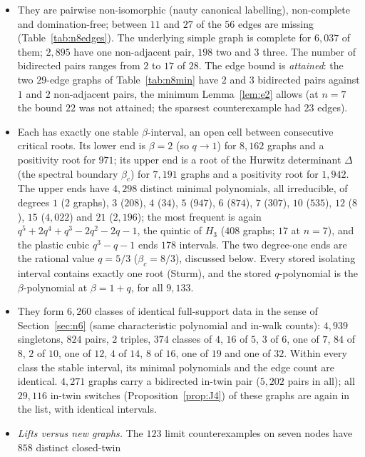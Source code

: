 \documentclass[11pt]{article}
\theoremstyle{definition}
\begin{document}
\begin{itemize}
\item They are pairwise non-isomorphic (nauty canonical labelling), non-complete and domination-free; between $11$ and
$27$ of the $56$ edges are missing (Table~\ref{tab:n8edges}). The underlying simple graph is complete for $6{,}037$ of them;
$2{,}895$ have one non-adjacent pair, $198$ two and $3$ three. The number of bidirected pairs ranges from $2$ to $17$ of
$28$. The edge bound is \emph{attained}: the two $29$-edge graphs of Table~\ref{tab:n8min} have $2$ and $3$ bidirected pairs
against $1$ and $2$ non-adjacent pairs, the minimum Lemma~\ref{lem:e2} allows (at $n=7$ the bound $22$ was not attained; the
sparsest counterexample had $23$ edges).
\item Each has exactly one stable $\beta$-interval, an open cell between consecutive critical roots. Its lower end is $\beta=2$
(so $q\to1$) for $8{,}162$ graphs and a positivity root for $971$; its upper end is a root of the Hurwitz determinant
$\Delta$ (the spectral boundary $\beta_c$) for $7{,}191$ graphs and a positivity root for $1{,}942$. The upper ends have
$4{,}298$ distinct minimal polynomials, all irreducible, of degrees $1$ ($2$ graphs), $3$ ($208$), $4$ ($34$), $5$ ($947$),
$6$ ($874$), $7$ ($307$), $10$ ($535$), $12$ ($8$), $15$ ($4{,}022$) and $21$ ($2{,}196$); the most frequent is again
$q^5+2q^4+q^3-2q^2-2q-1$, the quintic of $H_3$ ($408$ graphs; $17$ at $n=7$), and the plastic cubic $q^3-q-1$ ends
$178$ intervals. The two degree-one ends are the rational value $q=5/3$ ($\beta_c=8/3$), discussed below. Every stored
isolating interval contains exactly one root (Sturm), and the stored $q$-polynomial is the $\beta$-polynomial at
$\beta=1+q$, for all $9{,}133$.
\item They form $6{,}260$ classes of identical full-support data in the sense of Section~\ref{sec:n6} (same characteristic
polynomial and in-walk counts): $4{,}939$ singletons, $824$ pairs, $2$ triples, $374$ classes of $4$, $16$ of $5$, $3$ of
$6$, one of $7$, $84$ of $8$, $2$ of $10$, one of $12$, $4$ of $14$, $8$ of $16$, one of $19$ and one of $32$. Within every
class the stable interval, its minimal polynomials and the edge count are identical. $4{,}271$ graphs carry a bidirected
in-twin pair ($5{,}202$ pairs in all); all $29{,}116$ in-twin switches (Proposition~\ref{prop:J4}) of these graphs are
again in the list, with identical intervals.
\item \emph{Lifts versus new graphs.} The $123$ limit counterexamples on seven nodes have $858$ distinct closed-twin

\end{itemize}
\end{document}

